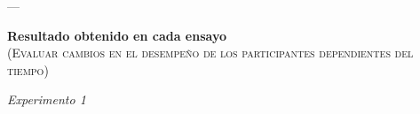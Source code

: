 \documentclass[a4paper ]{article}
\begin{document}
\clearpage
















---
\vspace{3mm}
\begin{center}
{\LARGE \textbf{Resultado obtenido en cada ensayo}}\\
{\small \textsc{(Evaluar cambios en el desempeño de los participantes dependientes del tiempo)}}\\
\smallskip
\end{center}
\begin{center}
{\LARGE \textit{Experimento 1}}\\
\end{center}
\vspace{3mm}
\end{document}
